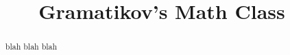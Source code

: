 \title{Gramatikov's Math Class}

 
  
\begin{abstract} 
blah blah blah
\end{abstract}  
\maketitle  
 

 
 
